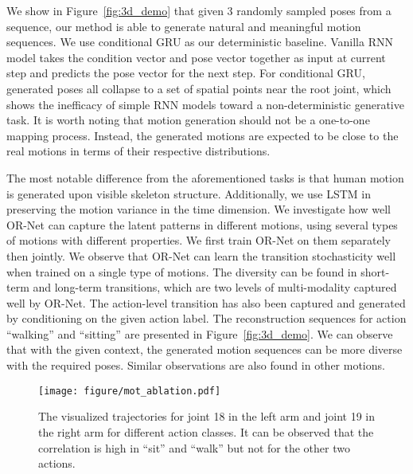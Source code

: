 \documentclass[sigconf]{acmart} %
\begin{document}
We show in Figure~\ref{fig:3d_demo} that given 3 randomly sampled poses from a sequence, our method is able to generate natural and meaningful motion sequences. We use conditional GRU as our deterministic baseline. Vanilla RNN model takes the condition vector and pose vector together as input at current step and predicts the pose vector for the next step. For conditional GRU, generated poses all collapse to a set of spatial points near the root joint, which shows the inefficacy of simple RNN models toward a non-deterministic generative task. It is worth noting that motion generation should not be a one-to-one mapping process. Instead, the generated motions are expected to be close to the real motions in terms of their respective distributions.



The most notable difference from the aforementioned tasks is that human motion is generated upon visible skeleton structure. Additionally, we use LSTM in preserving the motion variance in the time dimension. We investigate how well OR-Net can capture the latent patterns in different motions, using several types of motions with different properties. We first train OR-Net on them separately then jointly. We observe that OR-Net can learn the transition stochasticity well when trained on a single type of motions. The diversity can be found in short-term and long-term transitions, which are two levels of multi-modality captured well by OR-Net. The action-level transition has also been captured and generated by conditioning on the given action label. The reconstruction sequences for action ``walking'' and ``sitting'' are presented in Figure~\ref{fig:3d_demo}. We can observe that with the given context, the generated motion sequences can be more diverse with the required poses. Similar observations are also found in other motions.





\begin{figure}[t]
  \centering
  \texttt{[image: figure/mot\_ablation.pdf]}
  \caption{
    The visualized trajectories for joint 18 in the left arm and joint 19 in the right arm for different action classes. It can be observed that the correlation is high in ``sit'' and ``walk'' but not for the other two actions.
  }
  \label{fig:ablation_nb}
\end{figure}
\end{document}
